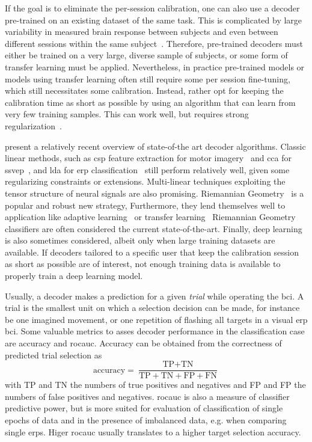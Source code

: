 
If the goal is to eliminate the per-session calibration, one can also use a
decoder pre-trained on an existing dataset of the same task.
This is complicated by large variability in measured brain response between subjects
and even between different sessions within the same
subject~\cite{Guger2009,Saha2020}.
Therefore, pre-trained decoders must either be trained on a very large, diverse
sample of subjects, or some form of transfer learning must be applied.
Nevertheless, in practice pre-trained models or models using transfer learning often still
require some per session fine-tuning, which still necessitates some
calibration.
Instead, rather opt for keeping the calibration time as short as possible by using
an algorithm that can learn from very few training samples.
This can work well, but requires strong regularization~\cite{VanDenKerchove2022}.

\textcite{Lotte2018, Xu2021} present a relatively recent overview of state-of-the art
decoder algorithms.
Classic linear methods, such as \ac{csp} feature extraction for
motor imagery~\cite{Park2017} and \ac{cca} for \ac{ssvep}~\cite{Nakanishi2017},
and \ac{lda} for \ac{erp} classification~\cite{Sosulski2022} still perform
relatively well, given some regularizing constraints or extensions.
Multi-linear techniques exploiting the tensor structure of neural signals are
also promising.
Riemannian Geometry~\cite{Barachant2014} is a popular and robust new strategy,
Furthermore, they lend themselves well to application like adaptive
learning~\cite{Benaroch2021} or transfer learning~\cite{Zanini2017}
Riemannian Geometry classifiers are often considered the current
state-of-the-art.
Finally, deep learning is also sometimes considered, albeit only when large
training datasets are available.
If decoders tailored to a specific user that keep the calibration session as
short as possible are of interest, not enough training data is available to
properly train a deep learning model.

Usually, a decoder makes a prediction for a given \emph{trial} while operating
the \ac{bci}.
A trial is the smallest unit on which a selection decision can be made, for
instance be one imagined movement, or one repetition of flashing all targets
in a visual \ac{erp} \ac{bci}.
Some valuable metrics to asses decoder performance in the classification case
are accuracy and \ac{rocauc}.
Accuracy can be obtained from the correctness of predicted trial selection as
\begin{equation}
  \text{accuracy} = \frac{\text{TP}+\text{TN}}{\text{TP}+\text{TN}+\text{FP}+\text{FN}}
\end{equation}
with TP and TN the numbers of true positives and negatives and FP and FP the
numbers of false positives and negatives.
\Ac{rocauc} is also a measure of classifier predictive power, but is more
suited for evaluation of classification of single epochs of data and in the
presence of imbalanced data, e.g. when
comparing single \acp{erp}.
Higer \ac{rocauc} usually translates to a higher target selection accuracy.

